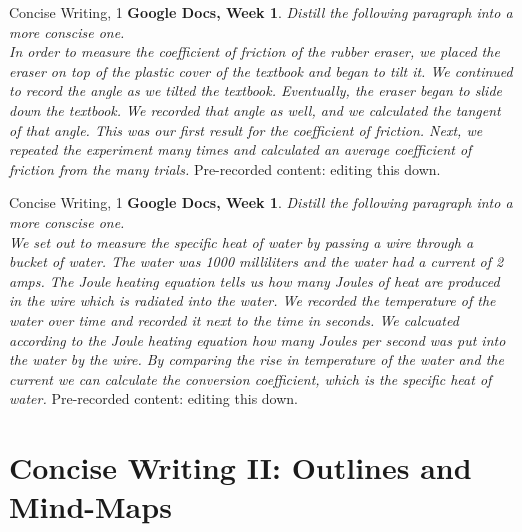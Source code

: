 \documentclass{beamer}
\begin{document}
\begin{frame}{Concise Writing, 1}
\textbf{Google Docs, Week 1}. \textit{Distill the following paragraph into a more conscise one.} \\ \vspace{0.25cm}
\textit{In order to measure the coefficient of friction of the rubber eraser, we placed the eraser on top of the plastic cover of the textbook and began to tilt it.  We continued to record the angle as we tilted the textbook.  Eventually, the eraser began to slide down the textbook.  We recorded that angle as well, and we calculated the tangent of that angle.  This was our first result for the coefficient of friction.  Next, we repeated the experiment many times and calculated an average coefficient of friction from the many trials.}
\alert{Pre-recorded content:} editing this down.
\end{frame}

\begin{frame}{Concise Writing, 1}
\textbf{Google Docs, Week 1}. \textit{Distill the following paragraph into a more conscise one.} \\ \vspace{0.25cm}
\textit{We set out to measure the specific heat of water by passing a wire through a bucket of water.  The water was 1000 milliliters and the water had a current of 2 amps.  The Joule heating equation tells us how many Joules of heat are produced in the wire which is radiated into the water.  We recorded the temperature of the water over time and recorded it next to the time in seconds.  We calcuated according to the Joule heating equation how many Joules per second was put into the water by the wire.  By comparing the rise in temperature of the water and the current we can calculate the conversion coefficient, which is the specific heat of water.}
\alert{Pre-recorded content:} editing this down.
\end{frame}

\section{Concise Writing II: Outlines and Mind-Maps}
\end{document}
